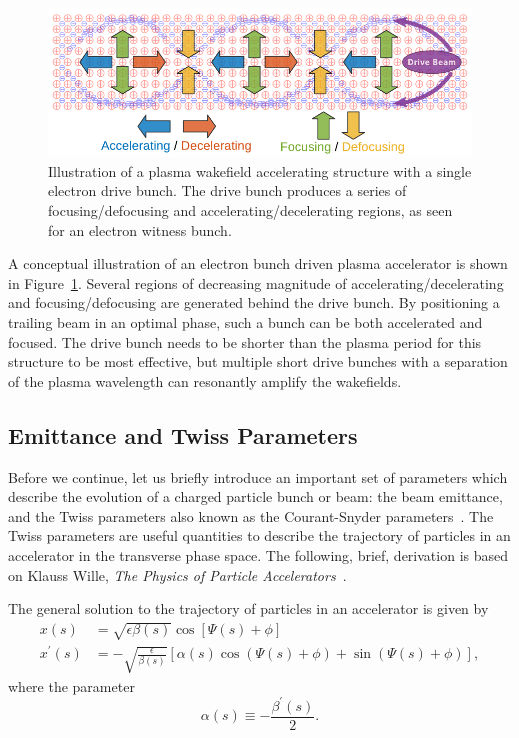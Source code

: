 \begin{figure}[hbt]
    \centering
    \includegraphics[width=0.85\linewidth]{figures/PlasmaWakefield}
    \caption{\label{Fig:PWFA:Illust} Illustration of a plasma wakefield accelerating structure with a single electron drive bunch.
    The drive bunch produces a series of focusing\slash de\-fo\-cus\-ing and accelerating\slash de\-cel\-e\-rat\-ing regions, as seen for an electron witness bunch.}
\end{figure}

A conceptual illustration of an electron bunch driven plasma accelerator is shown in Figure~\ref{Fig:PWFA:Illust}.
Several regions of decreasing magnitude of accelerating\slash decelerating and focusing\slash defocusing are generated behind the drive bunch.
By positioning a trailing beam in an optimal phase, such a bunch can be both accelerated and focused.
The drive bunch needs to be shorter than the plasma period for this structure to be most effective, but multiple short drive bunches with a separation of the plasma wavelength can resonantly amplify the wakefields.

\subsection{Emittance and Twiss Parameters}
\label{Int:BPI:EnTwiss}

Before we continue, let us briefly introduce an important set of parameters which describe the evolution of a charged particle bunch or beam: the beam emittance, and the Twiss parameters also known as the Courant-Snyder parameters~\cite{courant:1958}.
The Twiss parameters are useful quantities to describe the trajectory of particles in an accelerator in the transverse phase space.
The following, brief, derivation is based on Klauss Wille, \textit{The Physics of Particle Accelerators}~\cite{wille:2001}.

The general solution to the trajectory of particles in an accelerator is given by
\begin{align}
    x(s)          &=  \sqrt{\epsilon\beta(s)} \cos\left[\Psi(s) + \phi\right] \label{EQ:PTrajX} \\
    x^{\prime}(s) &= -\sqrt{\frac{\epsilon}{\beta(s)}}
                     \left[\alpha(s)\cos\left(\Psi(s) + \phi\right) + \sin\left(\Psi(s) + \phi\right)\right], \label{EQ:PTrajXP}
\end{align}
where the parameter
\begin{equation}
    \alpha(s) \equiv -\frac{\beta^{\prime}(s)}{2}. \label{EQ:TwissAlpha}
\end{equation}

